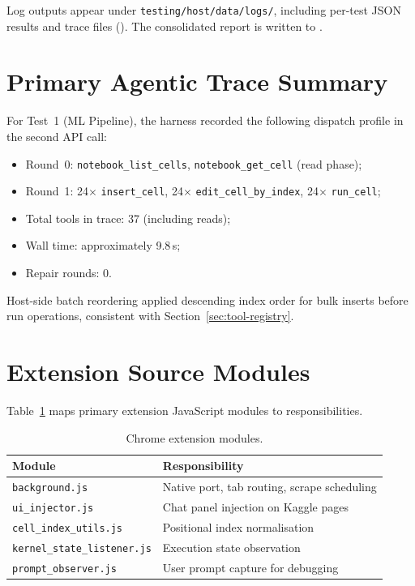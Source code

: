Log outputs appear under \texttt{testing/host/data/logs/}, including per-test JSON results and trace files ({\ttfamily{}}). The consolidated report is written to {\ttfamily{}}.

\section{Primary Agentic Trace Summary}
\label{app:trace}

For Test~1 (ML Pipeline), the harness recorded the following dispatch profile in the second \ac{API} call:

\begin{itemize}
  \item Round~0: \texttt{notebook\_list\_cells}, \texttt{notebook\_get\_cell} (read phase);
  \item Round~1: 24$\times$ \texttt{insert\_cell}, 24$\times$ \texttt{edit\_cell\_by\_index}, 24$\times$ \texttt{run\_cell};
  \item Total tools in trace: 37 (including reads);
  \item Wall time: approximately 9.8\,s;
  \item Repair rounds: 0.
\end{itemize}

Host-side batch reordering applied descending index order for bulk inserts before run operations, consistent with Section~\ref{sec:tool-registry}.

\section{Extension Source Modules}
\label{app:extension}

Table~\ref{tab:app-ext} maps primary extension JavaScript modules to responsibilities.

\begin{table}[!ht]
\centering
\caption{Chrome extension modules.}
\label{tab:app-ext}
\small
\begin{tabular}{|p{4.2cm}|p{8.4cm}|}
\hline
\textbf{Module} & \textbf{Responsibility} \\ \hline
\texttt{background.js} & Native port, tab routing, scrape scheduling \\ \hline
\texttt{ui\_injector.js} & Chat panel injection on Kaggle pages \\ \hline
\texttt{cell\_index\_utils.js} & Positional index normalisation \\ \hline
\texttt{kernel\_state\_listener.js} & Execution state observation \\ \hline
\texttt{prompt\_observer.js} & User prompt capture for debugging \\ \hline
\end{tabular}
\end{table}

